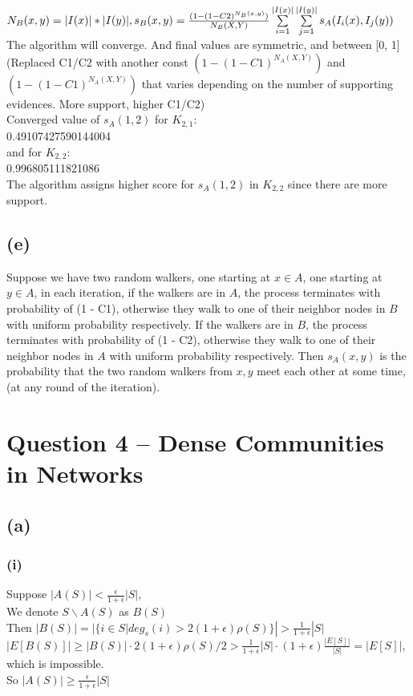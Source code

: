 \documentclass{article}
\begin{document}
$N_B(x, y) = |I(x)| * |I(y)|, \\
s_B(x, y) = \frac{ (1-(1-C2)^{N_B(x, y)})}
 {N_B(X, Y)} \sum\limits_{i=1}^{|I(x)|} \sum\limits_{j=1}^{|I(y)|} 
    s_A(I_i(x), I_j(y))$ \\
    
The algorithm will converge. And final values are symmetric, and between [0, 1](Replaced C1/C2 with another const $(1-(1-C1)^{N_A(X, Y)})$ and $(1-(1-C1)^{N_A(X, Y)})$ that varies depending on the number of supporting evidences. More support, higher C1/C2) \\

Converged value of $s_A(1, 2)$ for $K_{2,1}$: \\
 0.49107427590144004 \\
and for $K_{2,2}$: \\
0.996805111821086 \\

The algorithm assigns higher score for $s_A(1, 2)$ in $K_{2,2}$ since there are more support.

\subsection{(e)}
Suppose we have two random walkers, one starting at $x \in A$, one starting at $y \in A$, in each iteration, if the walkers are in $A$, the process terminates with probability of (1 - C1), otherwise they walk to one of their neighbor nodes in $B$ with uniform probability respectively. If the walkers are in $B$,  the process terminates with probability of (1 - C2), otherwise  they walk to one of their neighbor nodes in $A$ with uniform probability respectively. Then $s_A(x, y)$ is the probability that the two random walkers from $x, y$ meet each other at some time, (at any round of the iteration).

\section{Question 4 -- Dense Communities in Networks}
\subsection{(a)}
\subsubsection{(i)}
Suppose $|A(S)| < \frac{\epsilon}{1+\epsilon}|S|$, \\
We denote $S\backslash A(S)$ as $B(S)$ \\
Then $|B(S)| = |\{i \in S | deg_s(i) > 2(1 + \epsilon)\rho(S)\}| > \frac{1}{1 + \epsilon}|S|$ \\
$|E[B(S)]| \ge |B(S)| \cdot 2(1 + \epsilon)\rho(S)/2 > \frac{1}{1 + \epsilon}|S| \cdot (1 + \epsilon)\frac{|E[S]|}{|S|} = |E[S]|$, which is impossible. \\
So $|A(S)| \ge \frac{\epsilon}{1+\epsilon}|S|$
\end{document}
